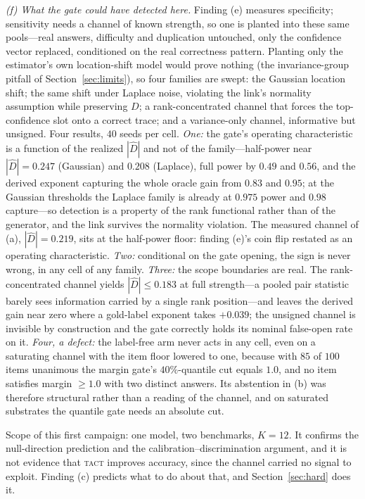 \documentclass[twoside,11pt]{article}
\newcommand{\Dhat}{\widehat{D}}
\newcommand{\TACT}{\textsc{tact}}
\begin{document}
\emph{(f) What the gate could have detected here.} Finding (e) measures
specificity; sensitivity needs a channel of known strength, so one is planted
into these same pools---real answers, difficulty and duplication untouched,
only the confidence vector replaced, conditioned on the real correctness
pattern. Planting only the estimator's own location-shift model would prove
nothing (the invariance-group pitfall of Section~\ref{sec:limits}), so four
families are swept: the Gaussian location shift; the same shift under Laplace
noise, violating the link's normality assumption while preserving $D$; a
rank-concentrated channel that forces the top-confidence slot onto a correct
trace; and a variance-only channel, informative but unsigned. Four results,
$40$ seeds per cell. \emph{One:} the gate's operating characteristic is a
function of the realized $|\Dhat|$ and not of the family---half-power near
$|\Dhat|=0.247$ (Gaussian) and $0.208$ (Laplace), full power by $0.49$ and
$0.56$, and the derived exponent capturing the whole oracle gain from $0.83$
and $0.95$; at the Gaussian thresholds the Laplace family is already at
$0.975$ power and $0.98$ capture---so detection is a property of the rank
functional rather than of the generator, and the link survives the normality
violation. The measured channel of (a), $|\Dhat|=0.219$, sits at the half-power
floor: finding (e)'s coin flip restated as an operating characteristic.
\emph{Two:} conditional on the gate opening, the sign is never wrong, in any
cell of any family. \emph{Three:} the scope boundaries are real. The
rank-concentrated channel yields $|\Dhat|\le0.183$ at full strength---a pooled
pair statistic barely sees information carried by a single rank position---and
leaves the derived gain near zero where a gold-label exponent takes $+0.039$;
the unsigned channel is invisible by construction and the gate correctly holds
its nominal false-open rate on it. \emph{Four, a defect:} the label-free arm
never acts in any cell, even on a saturating channel with the item floor
lowered to one, because with $85$ of $100$ items unanimous the margin gate's
$40\%$-quantile cut equals $1.0$, and no item satisfies margin $\ge 1.0$ with
two distinct answers. Its abstention in (b) was therefore structural rather
than a reading of the channel, and on saturated substrates the quantile gate
needs an absolute cut.

Scope of this first campaign: one model, two benchmarks, $K{=}12$. It confirms
the null-direction prediction and the calibration--discrimination argument, and
it is not evidence that \TACT{} improves accuracy, since the channel carried no
signal to exploit. Finding (c) predicts what to do about that, and
Section~\ref{sec:hard} does it.
\end{document}

